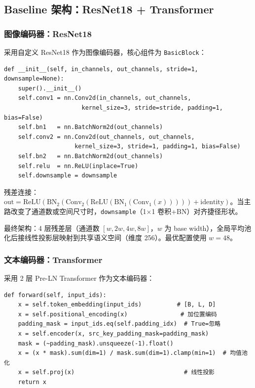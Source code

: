 \documentclass[12pt,a4paper]{article}
\begin{document}
\subsection{Baseline 架构：ResNet18 + Transformer}

\subsubsection{图像编码器：ResNet18}

采用自定义 ResNet18 作为图像编码器，核心组件为 \texttt{BasicBlock}：

\begin{lstlisting}[caption={ResNet BasicBlock 实现}]
def __init__(self, in_channels, out_channels, stride=1, downsample=None):
    super().__init__()
    self.conv1 = nn.Conv2d(in_channels, out_channels,
                      kernel_size=3, stride=stride, padding=1, bias=False)
    self.bn1   = nn.BatchNorm2d(out_channels)
    self.conv2 = nn.Conv2d(out_channels, out_channels,
                    kernel_size=3, stride=1, padding=1, bias=False)
    self.bn2   = nn.BatchNorm2d(out_channels)
    self.relu  = nn.ReLU(inplace=True)
    self.downsample = downsample
\end{lstlisting}

残差连接：$\text{out} = \text{ReLU}(\text{BN}_2(\text{Conv}_2(\text{ReLU}(\text{BN}_1(\text{Conv}_1(x))))) + \text{identity})$。当主路改变了通道数或空间尺寸时，\texttt{downsample}（1$\times$1 卷积+BN）对齐捷径形状。

最终架构：4 层残差层（通道数 $[w, 2w, 4w, 8w]$，$w$ 为 base width），全局平均池化后接线性投影层映射到共享语义空间（维度 256）。最优配置使用 $w=48$。

\subsubsection{文本编码器：Transformer}

采用 2 层 Pre-LN Transformer 作为文本编码器：

\begin{lstlisting}[caption={Transformer 文本编码器 forward}]
def forward(self, input_ids):
    x = self.token_embedding(input_ids)          # [B, L, D]
    x = self.positional_encoding(x)               # 加位置编码
    padding_mask = input_ids.eq(self.padding_idx)  # True=忽略
    x = self.encoder(x, src_key_padding_mask=padding_mask)
    mask = (~padding_mask).unsqueeze(-1).float()
    x = (x * mask).sum(dim=1) / mask.sum(dim=1).clamp(min=1)  # 均值池化
    x = self.proj(x)                               # 线性投影
    return x
\end{lstlisting}
\end{document}
